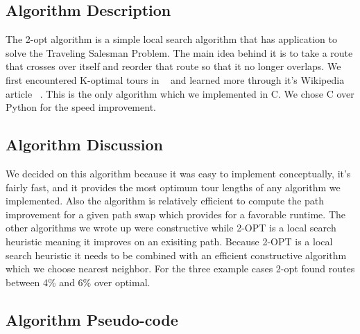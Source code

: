 \documentclass[../report/main.tex]{subfiles}
\begin{document}
\subsection*{Algorithm Description}

The 2-opt algorithm is a simple local search algorithm that has application to solve the Traveling Salesman Problem. The main idea behind it is to take a route that crosses over itself and reorder that route so that it no longer overlaps. We first encountered K-optimal tours in ~\cite{skiena/2008} and learned more through it's Wikipedia article ~\cite{wikipedia/2-opt}.  This is the only algorithm which we implemented in C.  We chose C over Python for the speed improvement.

\subsection*{Algorithm Discussion}

We decided on this algorithm because it was easy to implement conceptually, it's fairly fast, and it provides the most optimum tour lengths of any algorithm we implemented. Also the algorithm is relatively efficient to compute the path improvement for a given path swap which provides for a favorable runtime. The other algorithms we wrote up were constructive while 2-OPT is a local search heuristic meaning it improves on an exisiting path.  Because 2-OPT is a local search heuristic it needs to be combined with an efficient constructive algorithm which we choose nearest neighbor.  For the three example cases 2-opt found routes between 4\% and 6\% over optimal.

\subsection*{Algorithm Pseudo-code}
\end{document}
